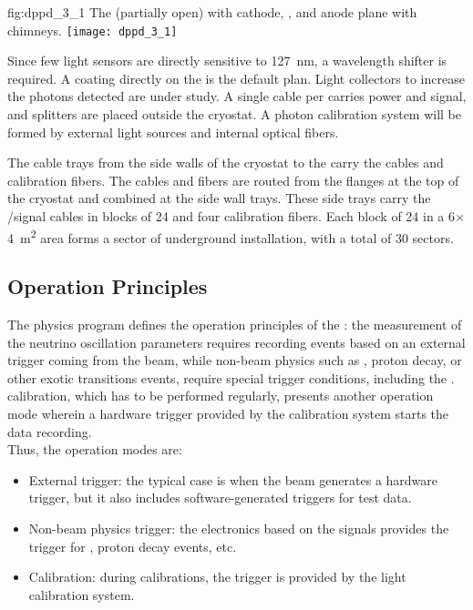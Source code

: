 \begin{dunefigure}{fig:dppd_3_1}
{The  (partially open) with cathode, ,  and anode plane with chimneys.}
\texttt{[image: dppd\_3\_1]}
\end{dunefigure}

Since few light sensors are directly sensitive to \SI{127}{nm}, a wavelength shifter is required. A  coating directly on the  is the default plan. Light collectors to increase the photons detected are under study. A single cable per  carries power and signal, and splitters are placed outside the cryostat. A photon calibration system will be formed by external light sources and internal optical fibers.  

The cable trays from the side walls of the cryostat to the  carry the cables and calibration fibers. The cables and fibers are routed from the \fdth flanges at the top of the cryostat and  combined at the side wall trays. These side trays carry the /signal cables in blocks of \num{24}  and four calibration fibers. Each block of \num{24}  in a \num{6}$\times$\SI{4}{m^2} area forms a sector of underground installation, with a total of \num{30} sectors.

\subsection{Operation Principles}
\label{sec:fddp-pd-1.5}

The physics program defines the operation principles of the : the measurement of the neutrino oscillation parameters requires recording events based on an external trigger coming from the beam, while non-beam physics such as  , proton decay, or other exotic transitions events, require special trigger conditions, including the .  calibration, which has to be performed regularly, presents another operation mode wherein  a hardware trigger provided by the calibration system starts the data recording. \\    

Thus, the operation modes are:
\begin{itemize}
\item External trigger: %
the typical case is when the beam generates a hardware trigger,  %
but it also includes software-generated triggers for test data.
\item Non-beam physics trigger: the electronics based on the  signals provides the trigger for  , proton decay events, etc.
\item Calibration: during  calibrations, the trigger is provided by the light calibration system.
\end{itemize}

